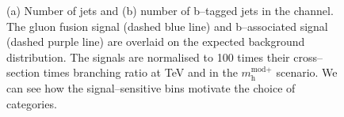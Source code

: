 \begin{figure}[h!]
\begin{center}
\end{center}
\caption[Number of jets and number of b-tagged jets in the \mutau channel, 
with the signal overlaid.]{(a) Number of jets and (b) number of b--tagged jets in the \mutau channel. The gluon fusion signal (dashed
blue line) and b--associated signal (dashed purple line) are overlaid on the expected background distribution. The signals
are normalised to 100 times their cross--section times branching ratio at  TeV and  in the $m_{\text{h}}^{\text{mod+}}$
scenario. We can see how the signal--sensitive bins motivate the choice of categories.}
\label{fig:mssm_cats_mt}
\end{figure}

